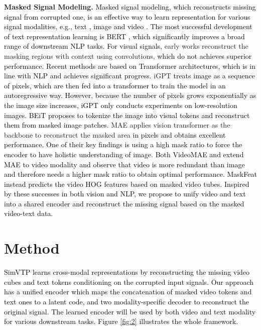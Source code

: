 \documentclass[10pt,twocolumn,letterpaper]{article}
\newcommand{\yty}[1]{\textcolor{black}{#1}}
\begin{document}
\noindent\textbf{Masked Signal Modeling.}
\yty{Masked signal modeling, which reconstructs missing signal from corrupted one, is an effective way to learn representation for various signal modalities, e.g., text \cite{devlin2018bert, brown2020language}, image \cite{chen2020generative}  and video \cite{tong2022videomae}.  The most successful development of text representation learning is BERT \cite{devlin2018bert}, which significantly improves a broad range of downstream NLP tasks. For visual signals,}
early works \cite{pathak2016context} reconstruct the masking regions with context using convolutions, \yty{which do not achieves superior performance.  Recent methods are based on Transformer architectures, which is in line with NLP and achieves significant progress. } iGPT \cite{chen2020generative} \yty{treats image as a sequence of pixels, which are then fed into a transformer to train the model in an autoregressive way. However, because the number of pixels grows exponentially as the image size increases, iGPT \cite{chen2020generative} only conducts experiments on low-resolution images. }\yty{BEiT \cite{bao2021beit} proposes to tokenize the image into visual tokens and reconstruct them from masked image patches.  }
MAE \cite{he2022masked} applies vision transformer as the backbone to reconstruct the masked area \yty{in pixels and obtains excellent performance. One of their key findings is using a high mask ratio to force the encoder to have holistic understanding of image. Both VideoMAE \cite{tong2022videomae} and \cite{feichtenhofer2022masked} extend MAE to video modality and observe that video is more redundant than image and therefore needs a higher mask ratio to obtain optimal performance. MaskFeat \cite{wei2022masked} instead predicts the video HOG features based on masked video tubes.  Inspired by these successes in both vision and NLP, we propose to unify video and text into a shared encoder and reconstruct the missing signal based on the masked video-text data. } 




\section{Method}
\label{sec:Method}
\yty{SimVTP learns cross-modal representations by reconstructing the missing video cubes and text tokens conditioning on the corrupted input signals.  Our approach has a unified encoder which maps the concatenation of masked video tokens and text ones to a latent code, and two modality-specific decoder to reconstruct the original signal.  The learned encoder will be used by both video and text modality for various downstream tasks. Figure \ref{fig:2} illustrates the whole framework.}
\end{document}
